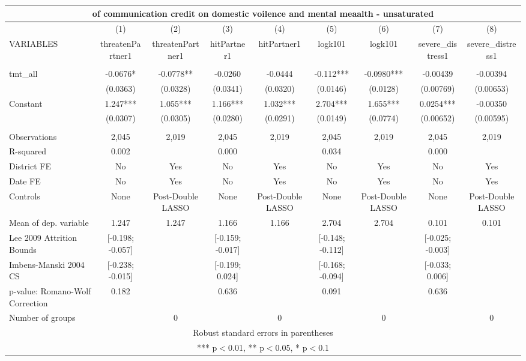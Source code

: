 \documentclass[]{article}
\begin{document}
\begin{tabular}{lcccccccc}
\multicolumn{9}{c}{of communication credit on domestic voilence and mental meaalth - unsaturated} \\ \hline
 & (1) & (2) & (3) & (4) & (5) & (6) & (7) & (8) \\
VARIABLES & threatenPartner1 & threatenPartner1 & hitPartner1 & hitPartner1 & logk101 & logk101 & severe\_distress1 & severe\_distress1 \\ \hline
 &  &  &  &  &  &  &  &  \\
tmt\_all & -0.0676* & -0.0778** & -0.0260 & -0.0444 & -0.112*** & -0.0980*** & -0.00439 & -0.00394 \\
 & (0.0363) & (0.0328) & (0.0341) & (0.0320) & (0.0146) & (0.0128) & (0.00769) & (0.00653) \\
Constant & 1.247*** & 1.055*** & 1.166*** & 1.032*** & 2.704*** & 1.655*** & 0.0254*** & -0.00350 \\
 & (0.0307) & (0.0305) & (0.0280) & (0.0291) & (0.0149) & (0.0774) & (0.00652) & (0.00595) \\
 &  &  &  &  &  &  &  &  \\
Observations & 2,045 & 2,019 & 2,045 & 2,019 & 2,045 & 2,019 & 2,045 & 2,019 \\
R-squared & 0.002 &  & 0.000 &  & 0.034 &  & 0.000 &  \\
District FE & No & Yes & No & Yes & No & Yes & No & Yes \\
Date FE & No & Yes & No & Yes & No & Yes & No & Yes \\
Controls & None & Post-Double LASSO & None & Post-Double LASSO & None & Post-Double LASSO & None & Post-Double LASSO \\
Mean of dep. variable & 1.247 & 1.247 & 1.166 & 1.166 & 2.704 & 2.704 & 0.101 & 0.101 \\
Lee 2009 Attrition Bounds & [-0.198; -0.057] &  & [-0.159; -0.017] &  & [-0.148; -0.112] &  & [-0.025; -0.003] &  \\
Imbens-Manski 2004 CS & [-0.238; -0.015] &  & [-0.199; 0.024] &  & [-0.168; -0.094] &  & [-0.033; 0.006] &  \\
p-value: Romano-Wolf Correction & 0.182 &  & 0.636 &  & 0.091 &  & 0.636 &  \\
 Number of groups &  & 0 &  & 0 &  & 0 &  & 0 \\ \hline
\multicolumn{9}{c}{ Robust standard errors in parentheses} \\
\multicolumn{9}{c}{ *** p$<$0.01, ** p$<$0.05, * p$<$0.1} \\
\end{tabular}
\end{document}
